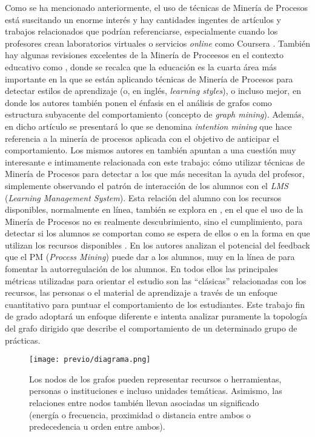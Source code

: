 Como se ha mencionado anteriormente, el uso de técnicas de Minería de Procesos está suscitando un enorme interés y hay cantidades ingentes de artículos y trabajos relacionados que podrían referenciarse, especialmente cuando los profesores crean laboratorios virtuales \cite{Elmoazen_2023} o servicios \emph{online} como Coursera \cite{mukala2015learning}. También hay algunas revisiones excelentes de la Minería de Proceesos en el contexto educativo como \cite{dos2019process}, donde se recalca que la educación es la cuarta área más importante en la que se están aplicando técnicas de Minería de Procesos para detectar estilos de aprendizaje (o, en inglés, \emph{learning styles}), o incluso mejor, en \cite{bogarin2018survey} donde los autores también ponen el énfasis en el análisis de grafos como estructura subyacente del comportamiento (concepto de \emph{graph mining}). Además, en dicho artículo se presentará lo que se denomina \emph{intention mining} que hace referencia a la minería de procesos aplicada con el objetivo de anticipar el comportamiento. Los mismos autores en \cite{bogarin2018discovering} también apuntan a una cuestión muy interesante e intimamente relacionada con este trabajo: cómo utilizar técnicas de Minería de Procesos para detectar a los que más necesitan la ayuda del profesor, simplemente observando el patrón de interacción de los alumnos con el \emph{LMS} (\emph{Learning Management System}). Esta relación del alumno con los recursos disponibles, normalmente en línea, también se explora en \cite{mukala2015learning}, en el que el uso de la Minería de Procesos no es realmente descubrimiento, sino el cumplimiento, para detectar si los alumnos se comportan como se espera de ellos o en la forma en que utilizan los recursos disponibles \cite{juhavnak2019using}. En \cite{sedrakyan2016process} los autores analizan el potencial del
feedback que el PM (\emph{Process Mining}) puede dar a los alumnos, muy en la línea de \citep{Keller_1968} para fomentar la autorregulación de los alumnos. En todos ellos las principales métricas utilizadas para orientar el estudio son las ``clásicas'' relacionadas con los recursos, las personas o el material de aprendizaje a través de un enfoque cuantitativo para puntuar el comportamiento de los estudiantes. Este trabajo fin de grado adoptará un enfoque diferente e intenta analizar puramente la topología del grafo dirigido que describe el comportamiento de un determinado grupo de prácticas.

\begin{figure}[H]
    \centering
    \texttt{[image: previo/diagrama.png]}
    \caption{Los nodos de los grafos pueden representar recursos o herramientas, personas o instituciones e incluso unidades temáticas. Asimismo, las relaciones entre nodos también llevan asociadas un significado (energía o frecuencia, proximidad o distancia entre ambos o predecedencia u orden entre ambos).}
    \label{fig:classification}
\end{figure}


